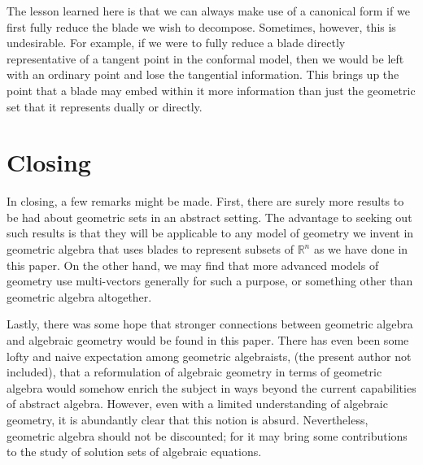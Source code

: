 \documentclass{birkjour}
\theoremstyle{definition}
\theoremstyle{remark}
\numberwithin{equation}{section}
\newcommand{\R}{\mathbb{R}}
\begin{document}
The lesson learned here is that we can always make use of a canonical form if we first
fully reduce the blade we wish to decompose.  Sometimes, however, this is undesirable.
For example, if we were to fully reduce a blade directly representative of a tangent
point in the conformal model, then we would be left with an ordinary point and lose the tangential information.
This brings up the point that a blade may embed within it more information than just the geometric
set that it represents dually or directly.

\section{Closing}

In closing, a few remarks might be made.  First, there are surely more results to be had
about geometric sets in an abstract setting.  The advantage to seeking out such
results is that they will be applicable to any model of geometry we invent
in geometric algebra that uses blades to represent subsets of $\R^n$ as we have
done in this paper.  On the other hand,
we may find that more advanced models of geometry use multi-vectors generally
for such a purpose, or something other than geometric algebra altogether.

Lastly, there was some hope that stronger connections between geometric algebra
and algebraic geometry would be found in this paper.  There has even been some
lofty and naive expectation among geometric algebraists, (the present author not included),
that a reformulation of algebraic geometry in terms of geometric algebra would somehow enrich the subject
in ways beyond the current capabilities of abstract algebra.  However, even with a limited understanding
of algebraic geometry, it is abundantly clear that this notion is absurd.  Nevertheless,
geometric algebra should not be discounted; for it may bring some contributions to the study of solution sets
of algebraic equations.

\begin{thebibliography}{9}

\end{thebibliography}
\end{document}
